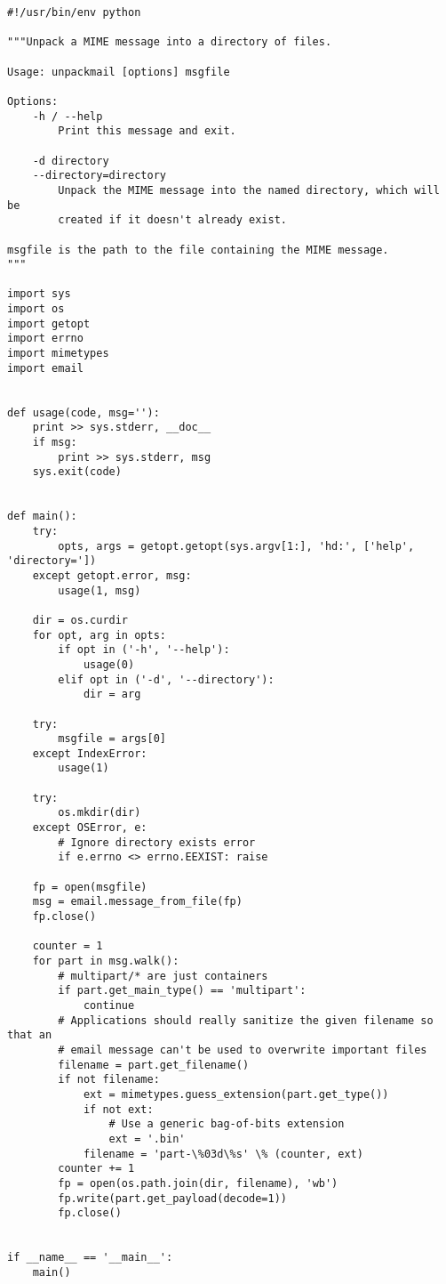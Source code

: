 \begin{verbatim}
#!/usr/bin/env python

"""Unpack a MIME message into a directory of files.

Usage: unpackmail [options] msgfile

Options:
    -h / --help
        Print this message and exit.

    -d directory
    --directory=directory
        Unpack the MIME message into the named directory, which will be
        created if it doesn't already exist.

msgfile is the path to the file containing the MIME message.
"""

import sys
import os
import getopt
import errno
import mimetypes
import email


def usage(code, msg=''):
    print >> sys.stderr, __doc__
    if msg:
        print >> sys.stderr, msg
    sys.exit(code)


def main():
    try:
        opts, args = getopt.getopt(sys.argv[1:], 'hd:', ['help', 'directory='])
    except getopt.error, msg:
        usage(1, msg)

    dir = os.curdir
    for opt, arg in opts:
        if opt in ('-h', '--help'):
            usage(0)
        elif opt in ('-d', '--directory'):
            dir = arg

    try:
        msgfile = args[0]
    except IndexError:
        usage(1)

    try:
        os.mkdir(dir)
    except OSError, e:
        # Ignore directory exists error
        if e.errno <> errno.EEXIST: raise

    fp = open(msgfile)
    msg = email.message_from_file(fp)
    fp.close()

    counter = 1
    for part in msg.walk():
        # multipart/* are just containers
        if part.get_main_type() == 'multipart':
            continue
        # Applications should really sanitize the given filename so that an
        # email message can't be used to overwrite important files
        filename = part.get_filename()
        if not filename:
            ext = mimetypes.guess_extension(part.get_type())
            if not ext:
                # Use a generic bag-of-bits extension
                ext = '.bin'
            filename = 'part-\%03d\%s' \% (counter, ext)
        counter += 1
        fp = open(os.path.join(dir, filename), 'wb')
        fp.write(part.get_payload(decode=1))
        fp.close()


if __name__ == '__main__':
    main()
\end{verbatim}
